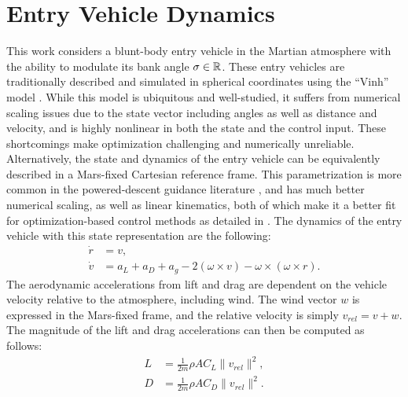 \section{Entry Vehicle Dynamics}\label{sec:cpeg2:section3}
This work considers a blunt-body entry vehicle in the Martian atmosphere with the ability to modulate its bank angle $\sigma \in \mathbb{R}{}$. These entry vehicles are traditionally described and simulated in spherical coordinates using the “Vinh” model \cite{busemann1976,vinh1980,vinh2000,wang2018,wang2019a,lu2014a,gallais2007}. While this model is ubiquitous and well-studied, it suffers from numerical scaling issues due to the state vector including angles as well as distance and velocity, and is highly nonlinear in both the state and the control input. These shortcomings make optimization challenging and numerically unreliable. Alternatively, the state and dynamics of the entry vehicle can be equivalently described in a Mars-fixed Cartesian reference frame. This parametrization is more common in the powered-descent guidance literature \cite{blackmore2012, acikmese2007, acikmese2013}, and has much better numerical scaling, as well as linear kinematics, both of which make it a better fit for optimization-based control methods as detailed in \cite{tracy2022}. The dynamics of the entry vehicle with this state representation are the following:
\begin{align}
    \dot{r} &= v, \\ 
    \dot{v} &= a_L + a_D + a_g - 2 (\omega \times v) - \omega \times (\omega \times r).
\end{align}
The aerodynamic accelerations from lift and drag are dependent on the vehicle velocity relative to the atmosphere, including wind. The wind vector $w$ is expressed in the Mars-fixed frame, and the relative velocity is simply $v_{rel} = v + w$. The magnitude of the lift and drag accelerations can then be computed as follows:
\begin{align}
    L &= \frac{1}{2m} \rho A C_L \|v_{rel}\|^2, \\ 
    D &= \frac{1}{2m} \rho A C_D \|v_{rel}\|^2.
\end{align}
